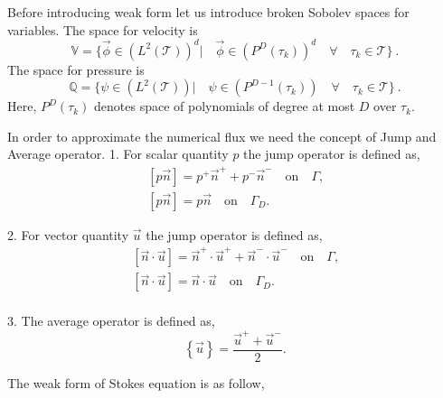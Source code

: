 \documentclass[graybox]{svmult}
\begin{document}
Before introducing weak form let us introduce broken Sobolev spaces for variables. 
The space for velocity is 
\begin{equation} \label{velocity_test}
\mathbb{V} = \lbrace \overrightarrow{\phi} \in (L^2(\mathcal{T}))^d| \quad \overrightarrow{\phi} \in (P^D(\tau_k))^d \quad \forall \quad {\tau_k} \in \mathcal{T} \rbrace \ .
\end{equation}
The space for pressure is 
\begin{equation} \label{pressure_test}
\mathbb{Q} = \lbrace \psi \in (L^2(\mathcal{T}))| \quad \psi \in (P^{D-1}(\tau_k)) \quad \forall \quad {\tau_k} \in \mathcal{T} \rbrace \ .
\end{equation}
Here, $P^D(\tau_k)$ denotes space of polynomials of degree at most $D$ over $\tau_k$.

In order to approximate the numerical flux we need the concept of Jump and Average operator. 
1.  For scalar quantity $p$ the jump operator is defined as,
\begin{equation}
\begin{split}
[p\overrightarrow{n}] = p^+ \overrightarrow{n}^+ + p^- \overrightarrow{n}^- \quad \textrm{on} \quad \Gamma \textrm{,}\\
[p\overrightarrow{n}] = p \overrightarrow{n} \quad \textrm{on} \quad \Gamma_D \textrm{.}
\end{split}
\end{equation}

2. For vector quantity $\overrightarrow{u}$ the jump operator is defined as,
\begin{equation}
\begin{split}
[\overrightarrow{n} \cdot \overrightarrow{u}] = \overrightarrow{n}^+ \cdot \overrightarrow{u}^+ + \overrightarrow{n}^- \cdot \overrightarrow{u}^- \quad \textrm{on} \quad \Gamma \textrm{,}\\
[\overrightarrow{n} \cdot \overrightarrow{u}] = \overrightarrow{n} \cdot \overrightarrow{u} \quad \textrm{on} \quad \Gamma_D \textrm{.}\\
\end{split}
\end{equation}

3. The average operator is defined as,
\begin{equation}\label{average operator}
\left\lbrace \overrightarrow{u} \right\rbrace = \frac{\overrightarrow{u}^+ + \overrightarrow{u}^-}{2} \textrm{.}
\end{equation} 

The weak form of Stokes equation is as follow,
\end{document}
